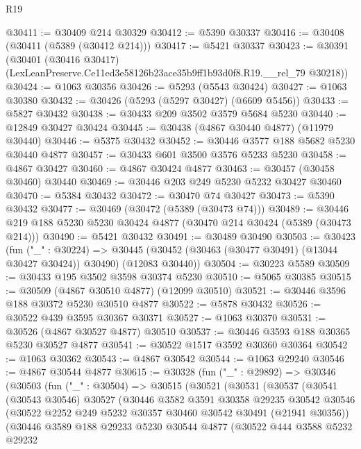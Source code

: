 \begin{lexlean}{R19}
\begin{coremodule}
@30411 := @30409 @214 @30329
@30412 := @5390 @30337
@30416 := @30408 (@30411 (@5389 (@30412 @214)))
@30417 := @5421 @30337
@30423 := @30391
    (@30401 (@30416 @30417) (LexLeanPreserve.Ce11ed3e58126b23ace35b9ff1b93d0f8.R19.__rel_79 @30218))
@30424 := @1063 @30356
@30426 := @5293 (@5543 @30424)
@30427 := @1063 @30380
@30432 := @30426 (@5293 (@5297 @30427) (@6609 @5456))
@30433 := @5827 @30432
@30438 := @30433 @209 @3502 @3579 @5684 @5230
@30440 := @12849 @30427 @30424
@30445 := @30438 (@4867 @30440 @4877) (@11979 @30440)
@30446 := @5375 @30432
@30452 := @30446 @3577 @188 @5682 @5230 @30440 @4877
@30457 := @30433 @601 @3500 @3576 @5233 @5230
@30458 := @4867 @30427
@30460 := @4867 @30424 @4877
@30463 := @30457 (@30458 @30460) @30440
@30469 := @30446 @203 @249 @5230 @5232 @30427 @30460
@30470 := @5384 @30432
@30472 := @30470 @74 @30427
@30473 := @5390 @30432
@30477 := @30469 (@30472 (@5389 (@30473 @74)))
@30489 := @30446 @219 @188 @5230 @5230 @30424 @4877 (@30470 @214 @30424 (@5389 (@30473 @214)))
@30490 := @5421 @30432
@30491 := @30489 @30490
@30503 := @30423
    (fun ("_" : @30224) =>
    @30445 (@30452 (@30463 (@30477 @30491) (@13044 @30427 @30424)) @30490) (@12083 @30440))
@30504 := @30223 @5589
@30509 := @30433 @195 @3502 @3598 @30374 @5230
@30510 := @5065 @30385
@30515 := @30509 (@4867 @30510 @4877) (@12099 @30510)
@30521 := @30446 @3596 @188 @30372 @5230 @30510 @4877
@30522 := @5878 @30432
@30526 := @30522 @439 @3595 @30367 @30371
@30527 := @1063 @30370
@30531 := @30526 (@4867 @30527 @4877) @30510
@30537 := @30446 @3593 @188 @30365 @5230 @30527 @4877
@30541 := @30522 @1517 @3592 @30360 @30364
@30542 := @1063 @30362
@30543 := @4867 @30542
@30544 := @1063 @29240
@30546 := @4867 @30544 @4877
@30615 := @30328
    (fun ("_" : @29892) =>
    @30346
      (@30503
        (fun ("_" : @30504) =>
        @30515
          (@30521
            (@30531
              (@30537
                (@30541
                  (@30543 @30546)
                  @30527
                  (@30446
                    @3582
                    @3591
                    @30358
                    @29235
                    @30542
                    @30546
                    (@30522 @2252 @249 @5232 @30357 @30460 @30542 @30491 (@21941 @30356))
                    (@30446
                      @3589
                      @188
                      @29233
                      @5230
                      @30544
                      @4877
                      (@30522
                        @444
                        @3588
                        @5232
                        @29232

\end{coremodule}
\end{lexlean}
